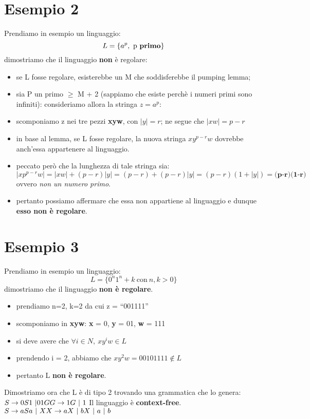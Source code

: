 \documentclass[a4paper]{report}
\begin{document}
\section{Esempio 2}
Prendiamo in esempio un linguaggio:
\[ L = \{a^p, \ \text{p \textbf{primo}}\}\]
dimostriamo che il linguaggio \textbf{non} è regolare:
\begin{itemize}
\item se L fosse regolare, esisterebbe un M che soddisferebbe il pumping lemma;
\item sia P un primo \(\ge\) M + 2 (sappiamo che esiste perchè i numeri primi sono infiniti): consideriamo allora la stringa \(z = a^p\):
\item scomponiamo z nei tre pezzi \textbf{xyw}, con \(\left | y \right | = r\); ne segue che \(\left | xw \right | = p - r\)
\item in base al lemma, se L fosse regolare, la nuova stringa \(xy^{p-r}w\) dovrebbe anch'essa appartenere al linguaggio.
\item peccato però che la lunghezza di tale stringa sia: \[\left | xp^{p-r}w \right | = \left | xw \right | + (p-r)\left |y\right | = (p-r) + (p-r)\left |y \right | = (p-r)(1+\left |y \right |) = \textbf{(p-r)(1-r)}\] ovvero \emph{non un numero primo}.
\item pertanto possiamo affermare che essa non appartiene al linguaggio e dunque \textbf{esso non è regolare}.
\end{itemize}

\section{Esempio 3}
Prendiamo in esempio un linguaggio:
\[ L = \{0^n1^n+k\ \text{con}\ n,k>0\}\]
dimostriamo che il linguaggio \textbf{non è regolare}.
\begin{itemize}
\item prendiamo n=2, k=2 da cui z = ``001111''
\item scomponiamo in \textbf{xyw}: \textbf{x} = 0, \textbf{y} = 01, \textbf{w} = 111
\item si deve avere che \(\forall i \in N,\ xy^iw \in L\)
\item prendendo i = 2, abbiamo che \(xy^2w = 00101111 \notin L\)
\item pertanto L \textbf{non è regolare}.
\end{itemize}
Dimostriamo ora che L è di tipo 2 trovando una grammatica che lo genera:
\(S \rightarrow 0S1\ | 01G \\ G \rightarrow 1G \ |\ 1 \) 
Il linguaggio è \textbf{context-free}. \newline\newline
\(S \rightarrow aSa\ |\ X \\ X \rightarrow aX\ |\ bX\ |\ a\ |\ b \) 
\end{document}
